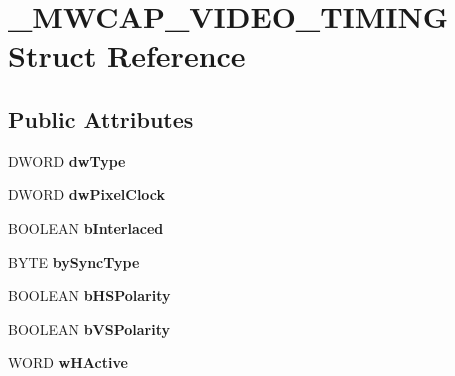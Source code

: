 \hypertarget{struct__MWCAP__VIDEO__TIMING}{\section{\-\_\-\-M\-W\-C\-A\-P\-\_\-\-V\-I\-D\-E\-O\-\_\-\-T\-I\-M\-I\-N\-G Struct Reference}
\label{struct__MWCAP__VIDEO__TIMING}
}
\subsection*{Public Attributes}
\begin{DoxyCompactItemize}
\item 
\hypertarget{struct__MWCAP__VIDEO__TIMING_a7fde2e09df164a86e9fab8aec4842620}{D\-W\-O\-R\-D {\bfseries dw\-Type}}\label{struct__MWCAP__VIDEO__TIMING_a7fde2e09df164a86e9fab8aec4842620}

\item 
\hypertarget{struct__MWCAP__VIDEO__TIMING_a39cec6cc6be2f77a4686cb9a50d3f99d}{D\-W\-O\-R\-D {\bfseries dw\-Pixel\-Clock}}\label{struct__MWCAP__VIDEO__TIMING_a39cec6cc6be2f77a4686cb9a50d3f99d}

\item 
\hypertarget{struct__MWCAP__VIDEO__TIMING_a2a9c96382596e5faecde2e9b5897dc75}{B\-O\-O\-L\-E\-A\-N {\bfseries b\-Interlaced}}\label{struct__MWCAP__VIDEO__TIMING_a2a9c96382596e5faecde2e9b5897dc75}

\item 
\hypertarget{struct__MWCAP__VIDEO__TIMING_a691ff04d81804a2e0cb527ce8a7a2a28}{B\-Y\-T\-E {\bfseries by\-Sync\-Type}}\label{struct__MWCAP__VIDEO__TIMING_a691ff04d81804a2e0cb527ce8a7a2a28}

\item 
\hypertarget{struct__MWCAP__VIDEO__TIMING_a7e78fce4bd68305b57bdb93da63ce43c}{B\-O\-O\-L\-E\-A\-N {\bfseries b\-H\-S\-Polarity}}\label{struct__MWCAP__VIDEO__TIMING_a7e78fce4bd68305b57bdb93da63ce43c}

\item 
\hypertarget{struct__MWCAP__VIDEO__TIMING_a0acacf8b247436beaa48b33f13805d01}{B\-O\-O\-L\-E\-A\-N {\bfseries b\-V\-S\-Polarity}}\label{struct__MWCAP__VIDEO__TIMING_a0acacf8b247436beaa48b33f13805d01}

\item 
\hypertarget{struct__MWCAP__VIDEO__TIMING_a6177f10da80f115ab0b4dcb8d8cfc97b}{W\-O\-R\-D {\bfseries w\-H\-Active}}\label{struct__MWCAP__VIDEO__TIMING_a6177f10da80f115ab0b4dcb8d8cfc97b}


\end{DoxyCompactItemize}
